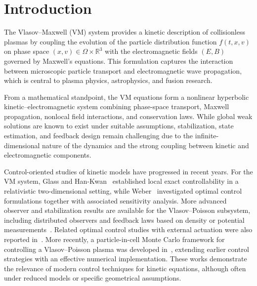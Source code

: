 \documentclass[AMA,Times2COL]{WileyNJDv5}
\begin{document}
\maketitle

\renewcommand\thefootnote{}

\section{Introduction}
\label{sec:intro}

The Vlasov--Maxwell (VM) system provides a kinetic description of collisionless plasmas by coupling the evolution of the particle distribution function $f(t,x,v)$ on phase space $(x,v)\in\Omega\times\mathbb{R}^3$ with the electromagnetic fields $(E,B)$ governed by Maxwell’s equations.
This formulation captures the interaction between microscopic particle transport and electromagnetic wave propagation, which is central to plasma physics, astrophysics, and fusion research.

From a mathematical standpoint, the VM equations form a nonlinear hyperbolic kinetic--electromagnetic system combining phase-space transport, Maxwell propagation, nonlocal field interactions, and conservation laws.
While global weak solutions are known to exist under suitable assumptions, stabilization, state estimation, and feedback design remain challenging due to the infinite-dimensional nature of the dynamics and the strong coupling
between kinetic and electromagnetic components.

Control-oriented studies of kinetic models have progressed in recent years.
For the VM system, Glass and Han-Kwan~\cite{GlassHanKwan2012} established local exact controllability in a relativistic two-dimensional setting, while Weber~\cite{Weber2021} investigated optimal control
formulations together with associated sensitivity analysis.
More advanced observer and stabilization results are available for the Vlasov--Poisson subsystem, including distributed observers and feedback laws based on density or potential measurements~\cite{cisse2020observers,cisse2024software,cisse2024state}.
Related optimal control studies with external actuation were also reported in~\cite{knopf2020optimal}. More recently, a particle-in-cell Monte Carlo framework for controlling a Vlasov--Poisson plasma was developed
in~\cite{bartsch2024controlling}, extending earlier control strategies with an effective numerical implementation.
These works demonstrate the relevance of modern control techniques for kinetic equations, although often under reduced models or specific geometrical assumptions.
\end{document}
